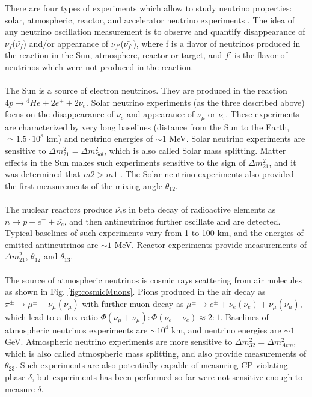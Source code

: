 There are four types of experiments which allow to study neutrino properties: solar, atmospheric, reactor, and accelerator neutrino experiments \cite{ref_PDG}. The idea of any neutrino oscillation measurement is to observe and quantify disappearance of $\nu_f$($\bar{\nu_f}$) and/or appearance of $\nu_{f'}$($\bar{\nu_{f'}}$), where f is a flavor of neutrinos produced in the reaction in the Sun, atmosphere, reactor or target, and $f'$ is the flavor of neutrinos which were not produced in the reaction.\\ \\
The Sun is a source of electron neutrinos. They are produced in the reaction $4p \rightarrow {^4}He+2e^{+}+2\nu_{e}$. Solar neutrino experiments (as the three described above) focus on the disappearance of $\nu_e$ and appearance of $\nu_\mu$ or $\nu_\tau$. These experiments are characterized by very long baselines (distance from the Sun to the Earth, $\simeq 1.5 \cdot 10^8$ km) and neutrino energies of $\sim 1$ MeV. Solar neutrino experiments are sensitive to ${\Delta}m^2_{21}={\Delta}m^2_{Sol}$, which is also called Solar mass splitting. Matter effects in the Sun makes such experiments sensitive to the sign of ${\Delta}m^2_{21}$, and it was determined that $m2>m1$ \cite{ref_presentation_MH}. The Solar neutrino experiments also provided the first measurements of the mixing angle $\theta_{12}$.\\ \\
The nuclear reactors produce $\bar{\nu_e}$s in beta decay of radioactive elements as $n \rightarrow p + e^- + \bar{\nu_e}$, and then antineutrinos further oscillate and are detected. Typical baselines of such experiments vary from 1 to 100 km, and the energies of emitted antineutrinos are $\sim 1$ MeV. Reactor experiments provide measurements of ${\Delta}m^2_{21}$, $\theta_{12}$ and $\theta_{13}$.\\ \\
The source of atmospheric neutrinos is cosmic rays scattering from air molecules as shown in Fig. \ref{fig:cosmicMuons}. Pions produced in the air decay as $\pi^{\pm} \rightarrow \mu^{\pm}+\nu_\mu(\bar{\nu_\mu})$ with further muon decay as $\mu^{\pm} \rightarrow e^{\pm}+\nu_e(\bar{\nu_e})+\bar{\nu_\mu}(\nu_\mu)$, which lead to a flux ratio $\Phi(\nu_\mu+\bar{\nu_\mu}):\Phi(\nu_e+\bar{\nu_e}) \approx 2:1$. Baselines of atmospheric neutrinos experiments are $\sim 10^4$ km, and neutrino energies are $\sim 1$ GeV. Atmospheric neutrino experiments are more sensitive to ${\Delta}m^2_{32}={\Delta}m^2_{Atm}$, which is also called atmospheric mass splitting, and also provide measurements of $\theta_{23}$. Such experiments are also potentially capable of measuring CP-violating phase $\delta$, but experiments has been performed so far were not sensitive enough to measure $\delta$. \\ \\

